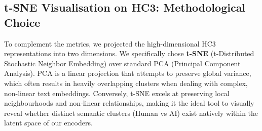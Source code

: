 \documentclass[11pt,a4paper]{article}
\begin{document}
\begin{table}[H]
    \centering
    \renewcommand{\arraystretch}{1.3}
    \caption{Global comparison of AI detection methods on GriD, HC3 and M4GT.}
    \label{tab:axe2-comparatif-global}
\end{table}

\subsection{t-SNE Visualisation on HC3: Methodological Choice}

To complement the metrics, we projected the high-dimensional HC3 representations into two dimensions. We specifically chose \textbf{t-SNE} (t-Distributed Stochastic Neighbor Embedding) over standard PCA (Principal Component Analysis). PCA is a linear projection that attempts to preserve global variance, which often results in heavily overlapping clusters when dealing with complex, non-linear text embeddings. Conversely, t-SNE excels at preserving local neighbourhoods and non-linear relationships, making it the ideal tool to visually reveal whether distinct semantic clusters (Human vs AI) exist natively within the latent space of our encoders.
\end{document}
